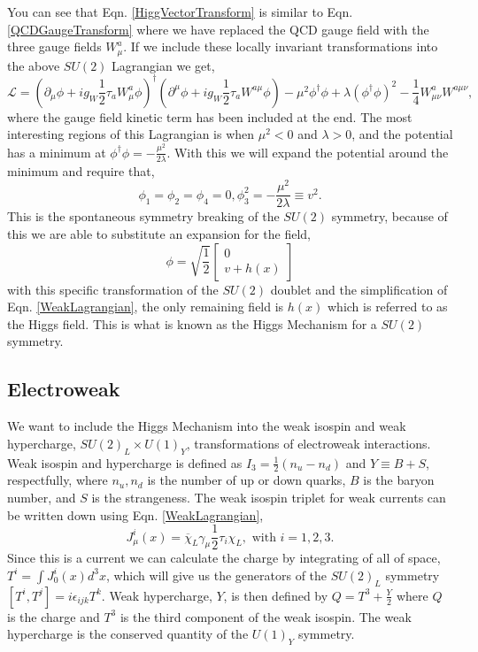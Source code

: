 You can see that Eqn. \ref{HiggVectorTransform} is similar to Eqn. \ref{QCDGaugeTransform} where we have replaced the QCD gauge field with the three gauge fields $W_\mu^a$. If we include these locally invariant transformations into the above $SU(2)$ Lagrangian we get,
\begin{equation}\label{WeakLagrangian}
\mathcal{L}=(\partial_\mu\phi+ig_W\frac{1}{2}\tau_{a}W^{a}_\mu\phi)^\dagger(\partial^\mu\phi+ig_W\frac{1}{2}\tau_{a}W^{a\mu}\phi)-\mu^2\phi^\dagger\phi+\lambda(\phi^\dagger\phi)^2-\frac{1}{4}W^{a}_{\mu\nu}W^{a\mu\nu},
\end{equation}
where the gauge field kinetic term has been included at the end. The most interesting regions of this Lagrangian is when $\mu^2<0$ and $\lambda>0$, and the potential has a minimum at $\phi^\dagger\phi=-\frac{\mu^2}{2\lambda}$. With this we will expand the potential around the minimum and require that,
\begin{equation}
\phi_1=\phi_2=\phi_4=0, \phi_3^2=-\frac{\mu^2}{2\lambda}\equiv v^2.
\end{equation}
This is the spontaneous symmetry breaking of the $SU(2)$ symmetry, because of this we are able to substitute an expansion for the field,
\begin{equation}
\phi=\sqrt{\frac{1}{2}}
\begin{bmatrix}
0 \\
v+h(x)
\end{bmatrix}
\end{equation}
with this specific transformation of the $SU(2)$ doublet and the simplification of Eqn. \ref{WeakLagrangian}, the only remaining field is $h(x)$ which is referred to as the Higgs field. This is what is known as the Higgs Mechanism for a $SU(2)$ symmetry. 

\subsection{Electroweak} \label{EMWeak}

We want to include the Higgs Mechanism into the weak isospin and weak hypercharge, $SU(2)_L\times U(1)_Y$, transformations of electroweak interactions. Weak isospin and hypercharge is defined as $I_3=\frac{1}{2}(n_u-n_d)$ and $Y\equiv B+S$, respectfully, where $n_u,n_d$ is the number of up or down quarks, $B$ is the baryon number, and $S$ is the strangeness. The weak isospin triplet for weak currents can be written down using Eqn. \ref{WeakLagrangian}, 
\begin{equation}\label{WeakIsospinCurrent}
J_\mu^i(x)=\overline{\chi}_L\gamma_\mu\frac{1}{2}\tau_i\chi_L, \text{ with } i=1,2,3.
\end{equation}
Since this is a current we can calculate the charge by integrating of all of space, $T^i=\int J_0^i(x)d^3x$, which will give us the generators of the $SU(2)_L$ symmetry $[T^i,T^j]=i\epsilon_{ijk}T^k$. Weak hypercharge, $Y$, is then defined by $Q=T^3+\frac{Y}{2}$ where $Q$ is the charge and $T^3$ is the third component of the weak isospin. The weak hypercharge is the conserved quantity of the $U(1)_Y$ symmetry. 

